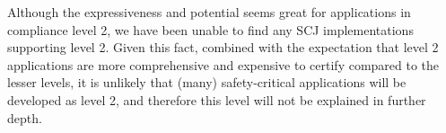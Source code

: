 
Although the expressiveness and potential seems great for applications in compliance level 2, we have been unable to find any SCJ implementations supporting level 2. Given this fact, combined with the expectation that level 2 applications are more comprehensive and expensive to certify compared to the lesser levels, it is unlikely that (many) safety-critical applications will be developed as level 2, and therefore this level will not be explained in further depth. 